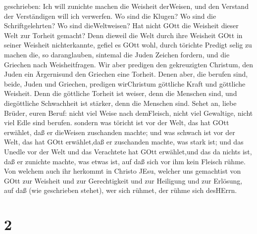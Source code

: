 geschrieben: Ich will zunichte machen die Weisheit derWeisen, und den
Verstand der Verständigen will ich verwerfen.  Wo sind die
Klugen? Wo sind die Schriftgelehrten? Wo sind dieWeltweisen? Hat nicht
GOtt die Weisheit dieser Welt zur Torheit gemacht?  Denn
dieweil die Welt durch ihre Weisheit GOtt in seiner Weisheit
nichterkannte, gefiel es GOtt wohl, durch törichte Predigt selig zu
machen die, so daranglauben,  sintemal die Juden Zeichen
fordern, und die Griechen nach Weisheitfragen.  Wir aber
predigen den gekreuzigten Christum, den Juden ein Ärgernisund den
Griechen eine Torheit.  Denen aber, die berufen sind,
beide, Juden und Griechen, predigen wirChristum göttliche Kraft und
göttliche Weisheit.  Denn die göttliche Torheit ist weiser,
denn die Menschen sind, und diegöttliche Schwachheit ist stärker, denn
die Menschen sind.  Sehet an, liebe Brüder, euren Beruf:
nicht viel Weise nach demFleisch, nicht viel Gewaltige, nicht viel Edle
sind berufen.  sondern was töricht ist vor der Welt, das
hat GOtt erwählet, daß er dieWeisen zuschanden machte; und was schwach
ist vor der Welt, das hat GOtt erwählet,daß er zuschanden machte, was
stark ist;  und das Unedle vor der Welt und das Verachtete
hat GOtt erwählet,und das da nichts ist, daß er zunichte machte, was
etwas ist,  auf daß sich vor ihm kein Fleisch rühme.
 Von welchem auch ihr herkommt in Christo JEsu, welcher uns
gemachtist von GOtt zur Weisheit und zur Gerechtigkeit und zur Heiligung
und zur Erlösung,  auf daß (wie geschrieben stehet), wer
sich rühmet, der rühme sich desHErrn.

\hypertarget{section-1}{%
\section{2}\label{section-1}}

